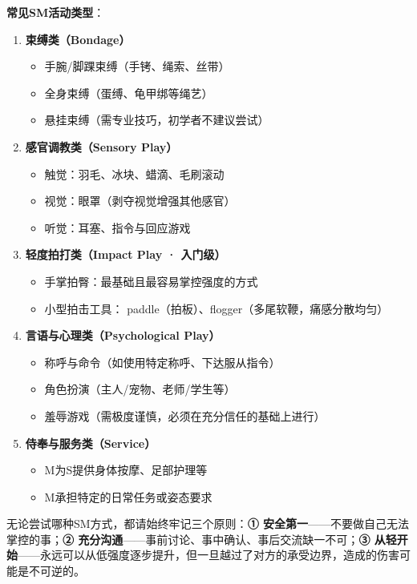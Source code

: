\documentclass[12pt,UTF8]{ctexbook}
\begin{document}
\noindent\textbf{常见SM活动类型}：

\begin{enumerate}
	\item \textbf{束缚类（Bondage）}
	\begin{itemize}
		\item 手腕/脚踝束缚（手铐、绳索、丝带）
		\item 全身束缚（蛋缚、龟甲绑等绳艺）
		\item 悬挂束缚（需专业技巧，初学者不建议尝试）
	\end{itemize}

	\item \textbf{感官调教类（Sensory Play）}
	\begin{itemize}
		\item 触觉：羽毛、冰块、蜡滴、毛刷滚动
		\item 视觉：眼罩（剥夺视觉增强其他感官）
		\item 听觉：耳塞、指令与回应游戏
	\end{itemize}

	\item \textbf{轻度拍打类（Impact Play · 入门级）}
	\begin{itemize}
		\item 手掌拍臀：最基础且最容易掌控强度的方式
		\item 小型拍击工具： paddle（拍板）、flogger（多尾软鞭，痛感分散均匀）
	\end{itemize}

	\item \textbf{言语与心理类（Psychological Play）}
	\begin{itemize}
		\item 称呼与命令（如使用特定称呼、下达服从指令）
		\item 角色扮演（主人/宠物、老师/学生等）
		\item 羞辱游戏（需极度谨慎，必须在充分信任的基础上进行）
	\end{itemize}

	\item \textbf{侍奉与服务类（Service）}
	\begin{itemize}
		\item M为S提供身体按摩、足部护理等
		\item M承担特定的日常任务或姿态要求
	\end{itemize}
\end{enumerate}

\begin{tcolorbox}[colback=pink!5!white,colframe=red!50!black,title=贴心小叮咛]
无论尝试哪种SM方式，都请始终牢记三个原则：\textbf{① 安全第一}——不要做自己无法掌控的事；\textbf{② 充分沟通}——事前讨论、事中确认、事后交流缺一不可；\textbf{③ 从轻开始}——永远可以从低强度逐步提升，但一旦越过了对方的承受边界，造成的伤害可能是不可逆的。
\end{tcolorbox}
\end{document}
